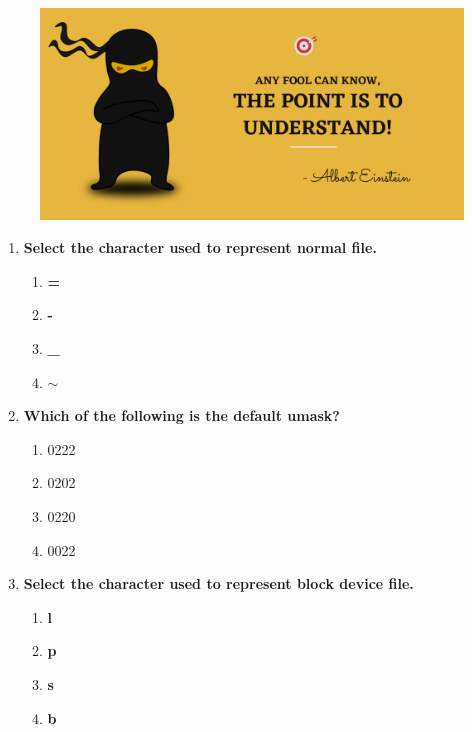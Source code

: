 \setlength{\columnsep}{3pt}
\begin{flushleft}
	\paragraph{}
	
	\bigskip
	
	\begin{figure}[h!]
		\centering
		\includegraphics[scale=.2]{content/practise.jpg}
	\end{figure}	
	\begin{enumerate}
		
		\item \textbf{Select the character used to represent normal file.}
		\begin{enumerate}[label=(\alph*)]
			\item \textbf{=}
			\item \textbf{-} %
			\item \textbf{\_}
			\item \textbf{$\sim$} 
		\end{enumerate}
		\bigskip
		\bigskip
		\item \textbf{Which of the following is the default umask?}
		\begin{enumerate}[label=(\alph*)]
			\item 0222
			\item 0202
			\item 0220
			\item 0022  %
		\end{enumerate}	
		\bigskip
		\bigskip
		
		
		\item \textbf{Select the character used to represent block device file.}
		\begin{enumerate}[label=(\alph*)]
			\item \textbf{l}   
			\item \textbf{p}
			\item \textbf{s}
			\item \textbf{b}   %
		\end{enumerate}
		\bigskip
		\bigskip
		

\end{enumerate}
\end{flushleft}
